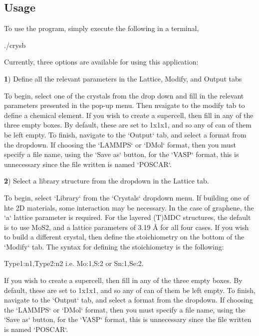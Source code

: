 \subsection*{Usage}

To use the program, simply execute the following in a terminal, \begin{DoxyVerb}    ./crysb  
\end{DoxyVerb}


Currently, three options are available for using this application\+:

{\bfseries 1}) Define all the relevant parameters in the {\ttfamily Lattice}, {\ttfamily Modify}, and {\ttfamily Output} tabs \begin{DoxyVerb}    To begin, select one of the crystals from the drop down and fill in the relevant parameters presented in 
    the pop-up menu.  Then nvaigate to the modify tab to define a chemical element. If you wish to create a  
    supercell, then fill in any of the three empty boxes.  By default, these are set to 1x1x1, and so any of 
    can of them be left empty.  To finish, navigate to the `Output` tab, and select a format from the dropdown.
    If choosing the `LAMMPS` or `DMol` format, then you must specify a file name, using the `Save as` button,
    for the `VASP` format, this is unnecessary since the file written is named `POSCAR`.
\end{DoxyVerb}


{\bfseries 2}) Select a library structure from the dropdown in the {\ttfamily Lattice} tab. \begin{DoxyVerb}    To begin, select `Library` from the `Crystals` dropdown menu.  If building one of hte 2D materials, some 
    interaction may be necessary.  In the case of graphene, the `a` lattice parameter is required.  For the
    layered (T)MDC structures, the default is to use MoS2, and a lattice parameters of 3.19 Å for all four
    cases.  If you wish to build a different crystal, then define the stoichiometry on the bottom of the 
    `Modify` tab.  The syntax for defining the stoichiometry is the following:

          Type1:n1,Type2:n2 i.e.  Mo:1,S:2 or  Sn:1,Se:2.

    If you wish to create a supercell, then fill in any of the three empty boxes.  By default, these are set 
    to 1x1x1, and so any of can of them be left empty.  To finish, navigate to the `Output` tab, and select 
    a format from the dropdown. If choosing the `LAMMPS` or `DMol` format, then you must specify a file name, 
    using the `Save as` button, for the `VASP` format, this is unnecessary since the file written is named `POSCAR`.
\end{DoxyVerb}


